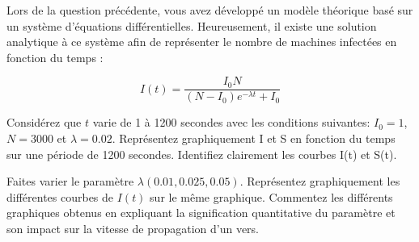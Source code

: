 
\begin{homeworkProblem}

	Lors de la question précédente, vous avez développé un modèle théorique basé sur un
	système d’équations différentielles. Heureusement, il existe une solution analytique à ce
	système afin de représenter le nombre de machines infectées en fonction du temps :
	
	\begin{equation}
		I(t)=\frac{I_0 N}{(N-I_0)e^{-\lambda t}+I_0}
		\label{moneq}
	\end{equation}

	\begin{homeworkSection}{3.1}
	
		Considérez que $t$ varie de 1 à 1200 secondes avec les conditions suivantes: $I_0= 1$, $N=3000$ et  $\lambda=0.02$. Représentez graphiquement I et S en fonction du temps sur une période de 1200 secondes. Identifiez clairement les courbes I(t) et S(t).\\
		
		
	\end{homeworkSection}
	
	\begin{homeworkSection}{3.2}
	
		Faites varier le paramètre  $\lambda (0.01, 0.025, 0.05)$. Représentez graphiquement les différentes courbes de $I(t)$ sur le même graphique. Commentez les différents graphiques obtenus en expliquant la signification quantitative du paramètre  et son impact sur la vitesse de propagation d'un vers. 
		

\end{homeworkSection}
\end{homeworkProblem}

